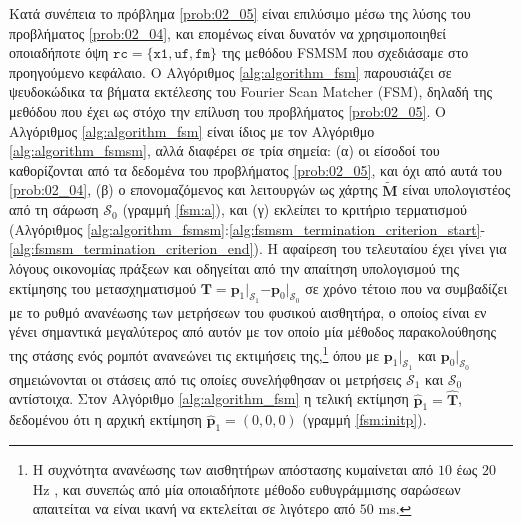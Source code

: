 Κατά συνέπεια το πρόβλημα \ref{prob:02_05} είναι επιλύσιμο μέσω της λύσης του
προβλήματος \ref{prob:02_04}, και επομένως είναι δυνατόν να χρησιμοποιηθεί
οποιαδήποτε όψη $\texttt{rc} = \{\texttt{x1}, \texttt{uf}, \texttt{fm}\}$ της
μεθόδου FSMSM που σχεδιάσαμε στο προηγούμενο κεφάλαιο. Ο Αλγόριθμος
\ref{alg:algorithm_fsm} παρουσιάζει σε ψευδοκώδικα τα βήματα εκτέλεσης του
Fourier Scan Matcher (FSM), δηλαδή της μεθόδου που έχει ως στόχο την επίλυση
του προβλήματος \ref{prob:02_05}. Ο Αλγόριθμος \ref{alg:algorithm_fsm} είναι
ίδιος με τον Αλγόριθμο \ref{alg:algorithm_fsmsm}, αλλά διαφέρει σε τρία σημεία:
(α) οι είσοδοί του καθορίζονται από τα δεδομένα του προβλήματος
\ref{prob:02_05}, και όχι από αυτά του \ref{prob:02_04}, (β) ο επονομαζόμενος
και λειτουργών ως χάρτης $\widetilde{\bm{M}}$ είναι υπολογιστέος από τη σάρωση
$\mathcal{S}_0$ (γραμμή \ref{fsm:a}), και (γ) εκλείπει το κριτήριο τερματισμού
(Αλγόριθμος
\ref{alg:algorithm_fsmsm}:\ref{alg:fsmsm_termination_criterion_start}-\ref{alg:fsmsm_termination_criterion_end}).
Η αφαίρεση του τελευταίου έχει γίνει για λόγους οικονομίας πράξεων και
οδηγείται από την απαίτηση υπολογισμού της εκτίμησης του μετασχηματισμού
$\bm{T} = \bm{p}_1$$|_{\mathcal{S}_1}$$ - \bm{p}_0$$|_{\mathcal{S}_0}$ σε χρόνο
τέτοιο που να συμβαδίζει με το ρυθμό ανανέωσης των μετρήσεων του φυσικού
αισθητήρα, ο οποίος είναι εν γένει σημαντικά μεγαλύτερος από αυτόν με τον οποίο
μία μέθοδος παρακολούθησης της στάσης ενός ρομπότ ανανεώνει τις εκτιμήσεις
της,\footnote{Η συχνότητα ανανέωσης των αισθητήρων απόστασης κυμαίνεται από
$10$ έως $20$ Hz \cite{velodyne_datasheet,a2m8_datasheet,ydlidar}, και συνεπώς
από μία οποιαδήποτε μέθοδο ευθυγράμμισης σαρώσεων απαιτείται να είναι ικανή να
εκτελείται σε λιγότερο από $50$ ms.} όπου με $\bm{p}_1$$|_{\mathcal{S}_1}$ και
$\bm{p}_0$$|_{\mathcal{S}_0}$ σημειώνονται οι στάσεις από τις οποίες
συνελήφθησαν οι μετρήσεις $\mathcal{S}_1$ και $\mathcal{S}_0$ αντίστοιχα.  Στον
Αλγόριθμο \ref{alg:algorithm_fsm} η τελική εκτίμηση $\hat{\bm{p}}_1 =
\hat{\bm{T}}$, δεδομένου ότι η αρχική εκτίμηση $\hat{\bm{p}}_1 = (0,0,0)$
(γραμμή \ref{fsm:initp}).

